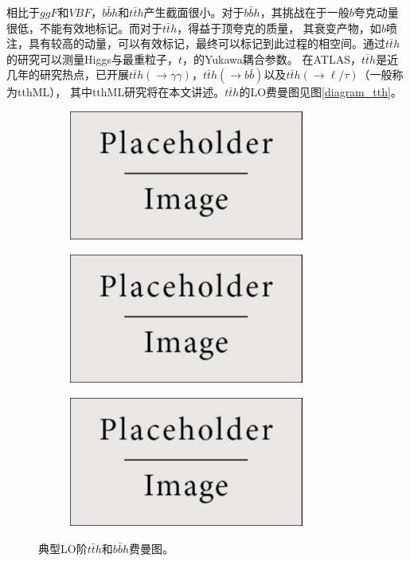 相比于$ggF$和$VBF$，$b\bar{b}h$和$t\bar{t}h$产生截面很小。对于$b\bar{b}h$，其挑战在于一般$b$夸克动量很低，不能有效地标记。而对于$t\bar{t}h$，得益于顶夸克的质量，
其衰变产物，如$b$喷注，具有较高的动量，可以有效标记，最终可以标记到此过程的相空间。通过$t\bar{t}h$的研究可以测量Higgs与最重粒子，$t$，的Yukawa耦合参数。
在ATLAS，$t\bar{t}h$是近几年的研究热点，已开展$t\bar{t}h(\rightarrow\gamma\gamma)$，$t\bar{t}h(\rightarrow b\bar{b})$以及$t\bar{t}h(\rightarrow \ell/\tau)$（一般称为tthML），
其中tthML研究将在本文讲述。$t\bar{t}h$的LO费曼图见图\ref{diagram_tth}。\\
\begin{figure}[h]
\centering
 \begin{subfigure}[b]{0.33\textwidth}
  \includegraphics[width=0.85\textwidth]{fig/placeholder.pdf}
  \caption{}
 \end{subfigure}
 \begin{subfigure}[b]{0.33\textwidth}
  \includegraphics[width=0.85\textwidth]{fig/placeholder.pdf}
  \caption{}
 \end{subfigure}
 \begin{subfigure}[b]{0.33\textwidth}
  \includegraphics[width=0.85\textwidth]{fig/placeholder.pdf}
  \caption{}
 \end{subfigure}
\caption{典型LO阶$t\bar{t}h$和$b\bar{b}h$费曼图。}
\label{fig:diagram_tth}
\end{figure}

